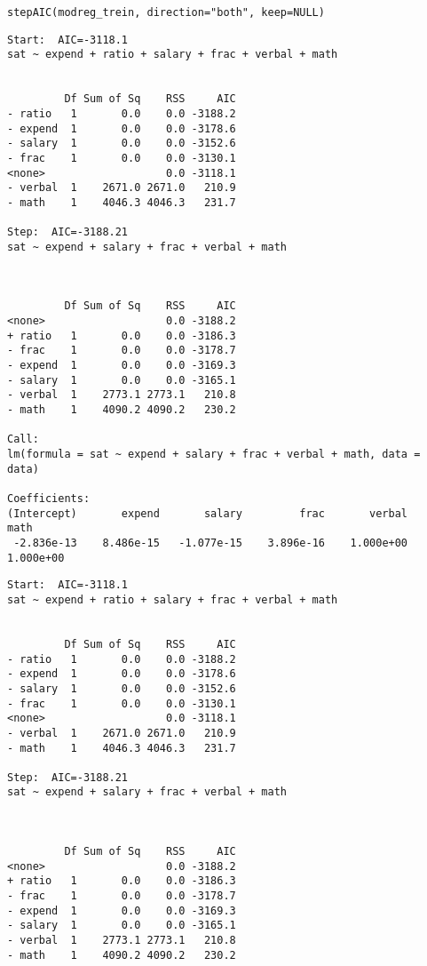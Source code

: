 \documentclass[11pt]{article}
\begin{document}
\begin{enumerate}
\begin{verbatim}
stepAIC(modreg_trein, direction="both", keep=NULL)
\end{verbatim}

\begin{verbatim}
Start:  AIC=-3118.1
sat ~ expend + ratio + salary + frac + verbal + math


         Df Sum of Sq    RSS     AIC
- ratio   1       0.0    0.0 -3188.2
- expend  1       0.0    0.0 -3178.6
- salary  1       0.0    0.0 -3152.6
- frac    1       0.0    0.0 -3130.1
<none>                   0.0 -3118.1
- verbal  1    2671.0 2671.0   210.9
- math    1    4046.3 4046.3   231.7

Step:  AIC=-3188.21
sat ~ expend + salary + frac + verbal + math



         Df Sum of Sq    RSS     AIC
<none>                   0.0 -3188.2
+ ratio   1       0.0    0.0 -3186.3
- frac    1       0.0    0.0 -3178.7
- expend  1       0.0    0.0 -3169.3
- salary  1       0.0    0.0 -3165.1
- verbal  1    2773.1 2773.1   210.8
- math    1    4090.2 4090.2   230.2

Call:
lm(formula = sat ~ expend + salary + frac + verbal + math, data = data)

Coefficients:
(Intercept)       expend       salary         frac       verbal         math  
 -2.836e-13    8.486e-15   -1.077e-15    3.896e-16    1.000e+00    1.000e+00  

\end{verbatim}

\begin{verbatim}
Start:  AIC=-3118.1
sat ~ expend + ratio + salary + frac + verbal + math


         Df Sum of Sq    RSS     AIC
- ratio   1       0.0    0.0 -3188.2
- expend  1       0.0    0.0 -3178.6
- salary  1       0.0    0.0 -3152.6
- frac    1       0.0    0.0 -3130.1
<none>                   0.0 -3118.1
- verbal  1    2671.0 2671.0   210.9
- math    1    4046.3 4046.3   231.7

Step:  AIC=-3188.21
sat ~ expend + salary + frac + verbal + math



         Df Sum of Sq    RSS     AIC
<none>                   0.0 -3188.2
+ ratio   1       0.0    0.0 -3186.3
- frac    1       0.0    0.0 -3178.7
- expend  1       0.0    0.0 -3169.3
- salary  1       0.0    0.0 -3165.1
- verbal  1    2773.1 2773.1   210.8
- math    1    4090.2 4090.2   230.2


\end{verbatim}
\end{enumerate}
\end{document}
